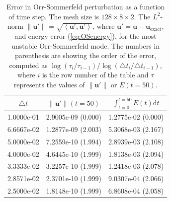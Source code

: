 \documentclass[preprint]{elsarticle}
\begin{document}
\begin{table}
	\centering
	\caption{Error in Orr-Sommerfeld perturbation as a function of time step. The mesh size is $128 \times 8 \times 2$. The $L^2$-norm $ \| \bm{u}' \| = \sqrt{\left< \bm{u}', \bm{u}'\right>}$, where $\bm{u}'=\bm{u}-\bm{u}_{\mathrm{exact}}$, and energy error (\ref{eq:OSenergy}), for the most unstable Orr-Sommerfeld mode. The numbers in parenthesis are showing the order of the error, computed as $\log(\tau_i/\tau_{i-1})/\log(\triangle t_i/ \triangle t_{i-1})$, where $i$ is the row number of the table and $\tau$ represents the values of $\|\bm{u}'\|$ or $E(t=50)$.  \label{tab:OS}}
	\begin{tabular}{ccc}	
 $\triangle t$ & $\| \bm{u}' \|(t=50)$ & $\int_{t=0}^{t=50}E(t) \mathrm{d}t$ \\
 \hline

1.0000e-01 & 2.9005e-09  (0.000) & 1.2775e-02 (0.000) \\
6.6667e-02 & 1.2877e-09  (2.003) & 5.3068e-03 (2.167) \\
5.0000e-02 & 7.2559e-10  (1.994) & 2.8939e-03 (2.108) \\
4.0000e-02 & 4.6445e-10  (1.999) & 1.8138e-03 (2.094) \\
3.3333e-02 & 3.2257e-10  (1.999) & 1.2418e-03 (2.078) \\
2.8571e-02 & 2.3701e-10  (1.999) & 9.0307e-04 (2.066) \\
2.5000e-02 & 1.8148e-10  (1.999) & 6.8608e-04 (2.058)
	\end{tabular}
\end{table}
\end{document}
